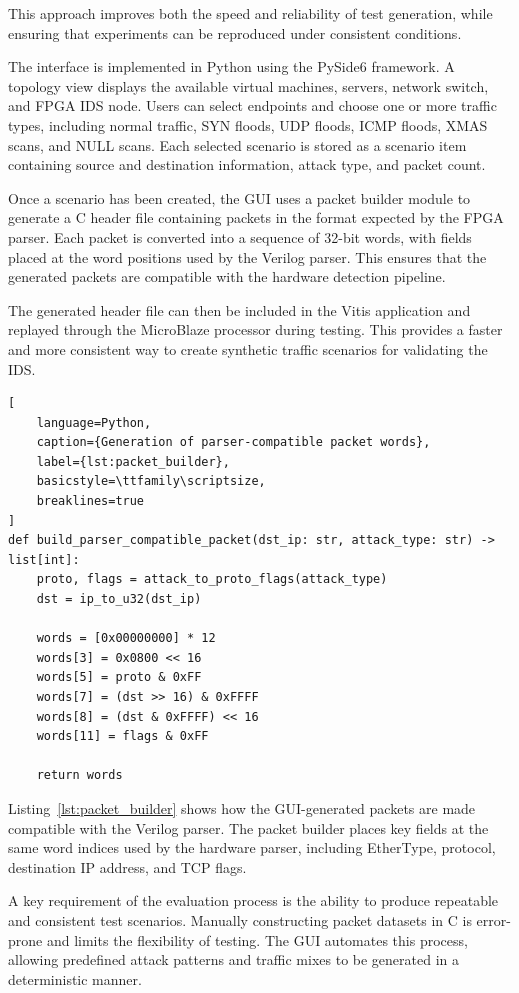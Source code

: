 This approach improves both the speed and reliability of test generation, while
ensuring that experiments can be reproduced under consistent conditions.

The interface is implemented in Python using the PySide6 framework. A topology view displays
the available virtual machines, servers, network switch, and FPGA IDS node.
Users can select endpoints and choose one or more traffic types, including
normal traffic, SYN floods, UDP floods, ICMP floods, XMAS scans, and NULL scans.
Each selected scenario is stored as a scenario item containing source and
destination information, attack type, and packet count.

Once a scenario has been created, the GUI uses a packet builder module to
generate a C header file containing packets in the format expected by the FPGA
parser. Each packet is converted into a sequence of 32-bit words, with fields
placed at the word positions used by the Verilog parser. This ensures that the
generated packets are compatible with the hardware detection pipeline.

The generated header file can then be included in the Vitis application and
replayed through the MicroBlaze processor during testing. This provides a faster
and more consistent way to create synthetic traffic scenarios for validating the
IDS.


\begin{lstlisting}[
    language=Python,
    caption={Generation of parser-compatible packet words},
    label={lst:packet_builder},
    basicstyle=\ttfamily\scriptsize,
    breaklines=true
]
def build_parser_compatible_packet(dst_ip: str, attack_type: str) -> list[int]:
    proto, flags = attack_to_proto_flags(attack_type)
    dst = ip_to_u32(dst_ip)

    words = [0x00000000] * 12
    words[3] = 0x0800 << 16
    words[5] = proto & 0xFF
    words[7] = (dst >> 16) & 0xFFFF
    words[8] = (dst & 0xFFFF) << 16
    words[11] = flags & 0xFF

    return words
\end{lstlisting}
Listing~\ref{lst:packet_builder} shows how the GUI-generated packets are made
compatible with the Verilog parser. The packet builder places key fields at the
same word indices used by the hardware parser, including EtherType, protocol,
destination IP address, and TCP flags.

A key requirement of the evaluation process is the ability to produce
repeatable and consistent test scenarios. Manually constructing packet
datasets in C is error-prone and limits the flexibility of testing.
The GUI automates this process, allowing predefined attack patterns and
traffic mixes to be generated in a deterministic manner.

